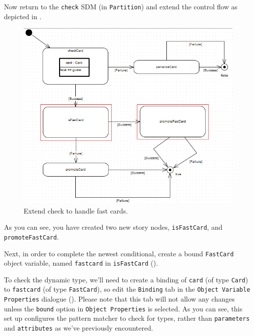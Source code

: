 \begin{stepbystep}
\vspace{0.5cm}

\item Now return to the \texttt{check} SDM (in \texttt{Partition}) and extend the control flow as depicted in
.

 \vspace{0.5cm}
 
\begin{figure}[htbp]
\begin{center}
  \includegraphics[width=\textwidth]{../../org.moflon.doc.handbook.03_storyDiagrams/11_fastCards/visFCImages/ea_extendCheck}
  \caption{Extend check to handle fast cards.}  
  \label{ea:extendCheck}
\end{center}
\end{figure}
 

\item As you can see, you have created two new story nodes, \texttt{isFastCard}, and \texttt{promoteFastCard}.
 
\item Next, in order to complete the newest conditional, create a bound \texttt{FastCard} object variable, named \texttt{fastcard} in
\texttt{isFastCard} ().
 
\item To check the dynamic type, we'll need to create a binding of \texttt{card} (of type \texttt{Card}) to \texttt{fastcard} (of
type \texttt{FastCard}), so edit the \texttt{Binding} tab in the \texttt{Object Variable Properties} dialogue (). Please note that
this tab will not allow any changes unless the \texttt{bound} option in \texttt{Object Properties} is selected. As you can see, this set up configures the
pattern matcher to check for types, rather than \texttt{parameters} and \texttt{attributes} as we've previously encountered.


\end{stepbystep}

